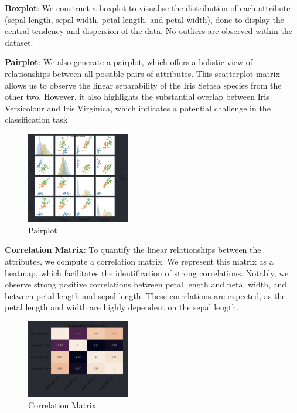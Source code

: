 \documentclass[conference]{inc/IEEEtran}
\begin{document}
\textbf{Boxplot}: We construct a boxplot to visualise the distribution of each attribute (sepal length, sepal width, petal length, and petal width), done to display the central tendency and dispersion of the data. No outliers are observed within the dataset.

\textbf{Pairplot}: We also generate a pairplot, which offers a holistic view of relationships between all possible pairs of attributes. This scatterplot matrix allows us to observe the linear separability of the Iris Setosa species from the other two. However, it also highlights the substantial overlap between Iris Versicolour and Iris Virginica, which indicates a potential challenge in the classification task

\begin{figure}
  \includegraphics[width=0.4\textwidth]{figures/pairplot.png}
  \caption{Pairplot}
  \label{fig:boat1}
\end{figure}

\textbf{Correlation Matrix}: To quantify the linear relationships between the attributes, we compute a correlation matrix. We represent this matrix as a heatmap, which facilitates the identification of strong correlations. Notably, we observe strong positive correlations between petal length and petal width, and between petal length and sepal length. These correlations are expected, as the petal length and width are highly dependent on the sepal length.

\begin{figure}
  \includegraphics[width=0.4\textwidth]{figures/correlationmatrix.png}
  \caption{Correlation Matrix}
  \label{fig:boat1}
\end{figure}
\end{document}

